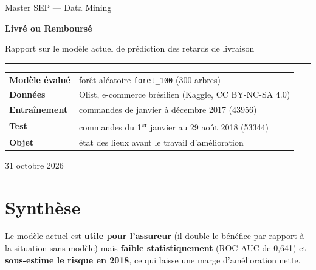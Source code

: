 \documentclass[11pt,a4paper]{article}
\newcommand{\var}[1]{\texttt{#1}}
\begin{document}
\sloppy

\begin{titlepage}
\vspace*{3cm}
{\sffamily\color{gris}\large Master SEP — Data Mining\par}
\vspace{0.6cm}
{\sffamily\bfseries\color{encre}\fontsize{30}{36}\selectfont Livré ou Remboursé\par}
\vspace{0.4cm}
{\raggedright\sffamily\Large Rapport sur le modèle actuel de prédiction des retards de livraison\par}
\vspace{1.2cm}
{\color{encre}\rule{\linewidth}{0.8pt}}
\vspace{0.6cm}

\begin{tabular}{@{}ll}
\textbf{Modèle évalué} & forêt aléatoire \var{foret\_100} (300 arbres) \\
\textbf{Données} & Olist, e-commerce brésilien (Kaggle, CC BY-NC-SA 4.0) \\
\textbf{Entraînement} & commandes de janvier à décembre 2017 (\num{43956}) \\
\textbf{Test} & commandes du 1\textsuperscript{er} janvier au 29 août 2018 (\num{53344}) \\
\textbf{Objet} & état des lieux avant le travail d'amélioration \\
\end{tabular}

\vfill
{\sffamily\color{gris}31 octobre 2026\par}
\end{titlepage}

\section*{Synthèse}

\begin{encadre}[title=En une phrase]
Le modèle actuel est \textbf{utile pour l'assureur} (il double le bénéfice par rapport à la
situation sans modèle) mais \textbf{faible statistiquement} (ROC-AUC de 0,641) et
\textbf{sous-estime le risque en 2018}, ce qui laisse une marge d'amélioration nette.
\end{encadre}
\end{document}
